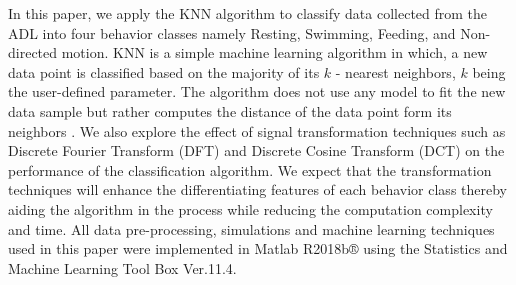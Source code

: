 \documentclass[conference]{IEEEtran}
\begin{document}
In this paper, we apply the KNN algorithm to classify data collected from the ADL into four behavior classes namely Resting, Swimming, Feeding, and Non-directed motion. KNN is a simple machine learning algorithm in which, a new data point is classified based on the majority of its $k$ - nearest neighbors, $k$ being the user-defined parameter. The algorithm does not use any model to fit the new data sample but rather computes the distance of the data point form its neighbors  \cite{7}. We also explore the effect of signal transformation techniques such as Discrete Fourier Transform (DFT) and Discrete Cosine Transform (DCT) on the performance of the classification algorithm. We expect that the transformation techniques will enhance the differentiating features of each behavior class thereby aiding the algorithm in the process while reducing the computation complexity and time. All data pre-processing, simulations and machine learning techniques used in this paper were implemented in Matlab R2018b® using the Statistics and Machine Learning Tool Box Ver.11.4.
\end{document}
